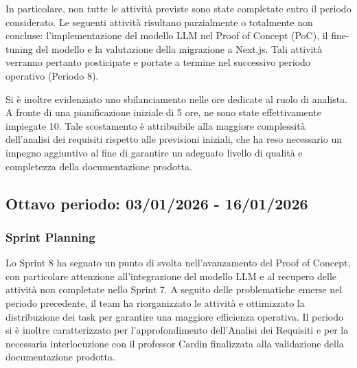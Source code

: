 \documentclass[a4paper, 11pt, oneside]{scrartcl} %
\begin{document}
In particolare, non tutte le attività previste sono state completate entro il periodo considerato. Le seguenti attività risultano parzialmente o totalmente non concluse: 
l’implementazione del modello LLM nel Proof of Concept (PoC), il fine-tuning del modello e la valutazione della migrazione a Next.js. Tali attività verranno pertanto posticipate e portate a termine nel successivo periodo operativo (Periodo 8).

Si è inoltre evidenziato uno sbilanciamento nelle ore dedicate al ruolo di analista. A fronte di una pianificazione iniziale di 5 ore, ne sono state effettivamente impiegate 10. 
Tale scostamento è attribuibile alla maggiore complessità dell’analisi dei requisiti rispetto alle previsioni iniziali, che ha reso necessario un impegno aggiuntivo al fine di garantire un adeguato livello di qualità e completezza della documentazione prodotta.
\newpage



\subsection{Ottavo periodo: 03/01/2026 - 16/01/2026}

\subsubsection*{Sprint Planning}

Lo Sprint 8 ha segnato un punto di svolta nell'avanzamento del Proof of Concept, con particolare attenzione all'integrazione del modello LLM e al recupero delle attività non completate nello Sprint 7. A seguito delle problematiche emerse nel periodo precedente, il team ha riorganizzato le attività e ottimizzato la distribuzione dei task per garantire una maggiore efficienza operativa. Il periodo si è inoltre caratterizzato per l'approfondimento dell'Analisi dei Requisiti e per la necessaria interlocuzione con il professor Cardin finalizzata alla validazione della documentazione prodotta.
\end{document}
